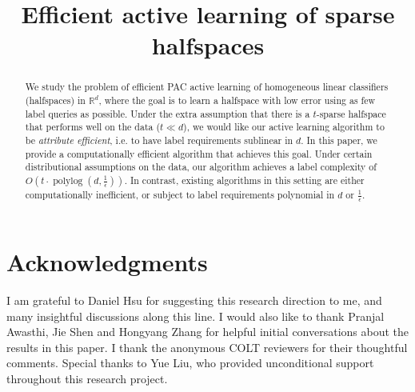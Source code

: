 \documentclass[final,12pt]{colt2018} %
\title[Efficient active learning of sparse halfspaces]{Efficient active learning of sparse halfspaces}
\def\R{\mathbb{R}}
\DeclareMathOperator{\polylog}{polylog}
\begin{document}
\maketitle

\begin{abstract}
We study the problem of efficient PAC active learning of homogeneous linear classifiers (halfspaces) in $\R^d$, where the goal is to learn
a halfspace with low error using as few label queries as possible.
Under the extra assumption that there is a $t$-sparse halfspace that
performs well on the data ($t \ll d$),
we would like our active learning algorithm to be {\em attribute efficient}, i.e. to have label requirements sublinear in $d$.
In this paper, we provide a computationally efficient algorithm that achieves this goal.
Under certain distributional assumptions on the data, our algorithm achieves a label complexity of $O(t \cdot \polylog(d, \frac 1 \epsilon))$.
In contrast, existing algorithms in this setting are either computationally inefficient, or subject to label requirements
polynomial in $d$ or $\frac 1 \epsilon$.
\end{abstract}









\section*{Acknowledgments}
I am grateful to Daniel Hsu for suggesting this research direction to me, and many insightful discussions along this line. I would also like to thank Pranjal Awasthi, Jie Shen and Hongyang Zhang for helpful initial conversations about the results in this paper. I thank the anonymous COLT reviewers for their thoughtful comments. Special thanks to Yue Liu, who provided unconditional support throughout this research project.

%


\newpage
\appendix

\end{document}
